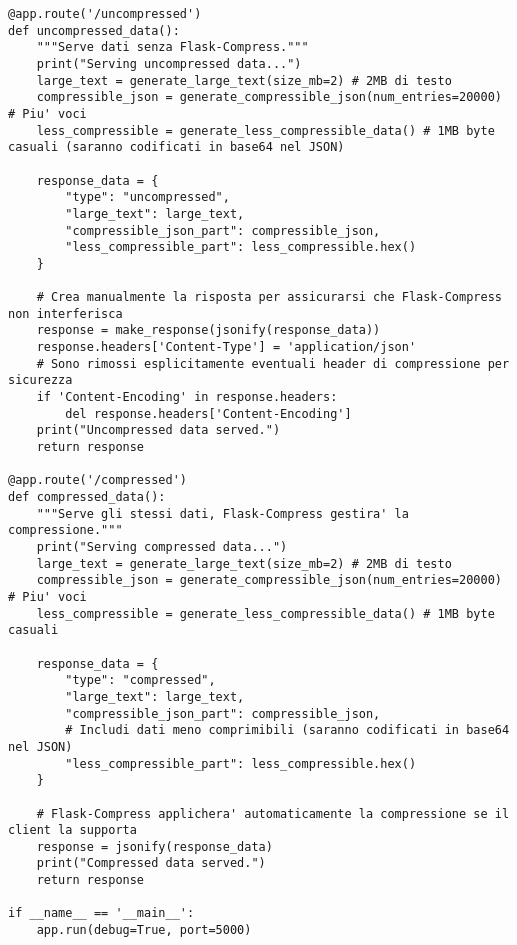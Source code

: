 \begin{longlisting}
\begin{verbatim}
@app.route('/uncompressed')
def uncompressed_data():
    """Serve dati senza Flask-Compress."""
    print("Serving uncompressed data...")
    large_text = generate_large_text(size_mb=2) # 2MB di testo
    compressible_json = generate_compressible_json(num_entries=20000) # Piu' voci
    less_compressible = generate_less_compressible_data() # 1MB byte casuali (saranno codificati in base64 nel JSON)

    response_data = {
        "type": "uncompressed",
        "large_text": large_text,
        "compressible_json_part": compressible_json,
        "less_compressible_part": less_compressible.hex()
    }

    # Crea manualmente la risposta per assicurarsi che Flask-Compress non interferisca
    response = make_response(jsonify(response_data))
    response.headers['Content-Type'] = 'application/json'
    # Sono rimossi esplicitamente eventuali header di compressione per sicurezza
    if 'Content-Encoding' in response.headers:
        del response.headers['Content-Encoding']
    print("Uncompressed data served.")
    return response

@app.route('/compressed')
def compressed_data():
    """Serve gli stessi dati, Flask-Compress gestira' la compressione."""
    print("Serving compressed data...")
    large_text = generate_large_text(size_mb=2) # 2MB di testo
    compressible_json = generate_compressible_json(num_entries=20000) # Piu' voci
    less_compressible = generate_less_compressible_data() # 1MB byte casuali

    response_data = {
        "type": "compressed",
        "large_text": large_text,
        "compressible_json_part": compressible_json,
        # Includi dati meno comprimibili (saranno codificati in base64 nel JSON)
        "less_compressible_part": less_compressible.hex()
    }

    # Flask-Compress applichera' automaticamente la compressione se il client la supporta
    response = jsonify(response_data)
    print("Compressed data served.")
    return response
    
if __name__ == '__main__':
    app.run(debug=True, port=5000)
\end{verbatim}
\end{longlisting}



